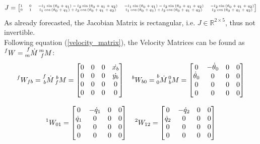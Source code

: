 \documentclass[a4paper,12pt,oneside]{report}
\begin{document}
\begin{equation}
  \begin{tiny}
  J=\begin{bmatrix}
    1&0&-l_1\sin{(\theta_0+q_1)}-l_2\sin{(\theta_0+q_1+q_2)}&-l_1\sin{(\theta_0+q_1)}-l_2\sin{(\theta_0+q_1+q_2)}&-l_2\sin{(\theta_0+q_1+q_2)}\\
    0&1&l_1\cos{(\theta_0+q_1)}+l_2\cos{(\theta_0+q_1+q_2)}&l_1\cos{(\theta_0+q_1)}+l_2\cos{(\theta_0+q_1+q_2)}&l_2\cos{(\theta_0+q_1+q_2)}
  \end{bmatrix}
\end{tiny}
\end{equation}
As already forecasted, the Jacobian Matrix is rectangular, i.e. $J\in \mathbb{R}^{2\times5}$, thus not invertible.\\
Following equation (\ref{velocity_matrix}), the Velocity Matrices can be found as $\prescript{f}{}{W}=\prescript{f}{m}{\dot{M}}\prescript{m}{f}{M}$:
\begin{equation}
  \begin{array}{c}
    \prescript{f}{}{W_{fb}}=\prescript{f}{b}{\dot{M}}\prescript{b}{f}{M}=\begin{bmatrix}
      0&0&0&\dot{x_b}\\
      0&0&0&\dot{y_b}\\
      0&0&0&0\\
      0&0&0&0
    \end{bmatrix} \quad
    \prescript{b}{}{W_{b0}}=\prescript{b}{0}{\dot{M}}\prescript{0}{b}{M}=\begin{bmatrix}
      0&-\dot{\theta}_0&0&0\\
     \dot{ \theta}_0&0&0&0\\
      0&0&0&0\\
      0&0&0&0
    \end{bmatrix}\\ \\
    \prescript{1}{}{W_{01}}=\begin{bmatrix}
      0&-\dot{q}_1&0&0\\
      \dot{q}_1&0&0&0\\
      0&0&0&0\\
      0&0&0&0
    \end{bmatrix} \quad
    \prescript{2}{}{W_{12}}=\begin{bmatrix}
      0&-\dot{q}_2&0&0\\
      \dot{q}_2&0&0&0\\
      0&0&0&0\\
      0&0&0&0
    \end{bmatrix}
  \end{array}
\end{equation}
\end{document}
